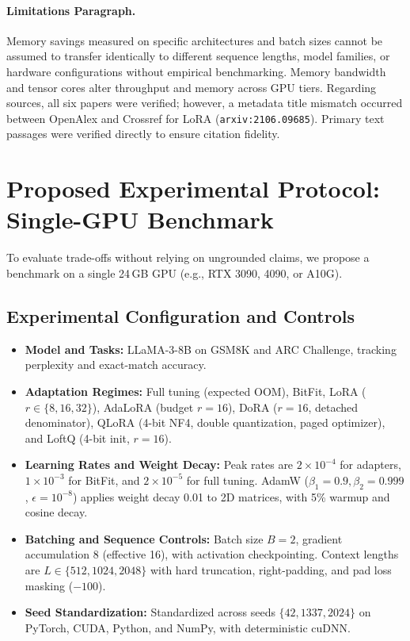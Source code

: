 \documentclass[11pt,a4paper]{article}
\begin{document}
\paragraph{Limitations Paragraph.}
Memory savings measured on specific architectures and batch sizes cannot be assumed to transfer identically to different sequence lengths, model families, or hardware configurations without empirical benchmarking. Memory bandwidth and tensor cores alter throughput and memory across GPU tiers. Regarding sources, all six papers were verified; however, a metadata title mismatch occurred between OpenAlex and Crossref for LoRA (\texttt{arxiv:2106.09685}). Primary text passages were verified directly to ensure citation fidelity.

\section{Proposed Experimental Protocol: Single-GPU Benchmark}

To evaluate trade-offs without relying on ungrounded claims, we propose a benchmark on a single 24\,GB GPU (e.g., RTX 3090, 4090, or A10G).

\subsection{Experimental Configuration and Controls}
\begin{itemize}
    \item \textbf{Model and Tasks:} LLaMA-3-8B on GSM8K and ARC Challenge, tracking perplexity and exact-match accuracy.
    \item \textbf{Adaptation Regimes:} Full tuning (expected OOM), BitFit, LoRA ($r \in \{8, 16, 32\}$), AdaLoRA (budget $r=16$), DoRA ($r=16$, detached denominator), QLoRA (4-bit NF4, double quantization, paged optimizer), and LoftQ (4-bit init, $r=16$).
    \item \textbf{Learning Rates and Weight Decay:} Peak rates are $2 \times 10^{-4}$ for adapters, $1 \times 10^{-3}$ for BitFit, and $2 \times 10^{-5}$ for full tuning. AdamW ($\beta_1=0.9, \beta_2=0.999$, $\epsilon=10^{-8}$) applies weight decay 0.01 to 2D matrices, with 5\% warmup and cosine decay.
    \item \textbf{Batching and Sequence Controls:} Batch size $B=2$, gradient accumulation 8 (effective 16), with activation checkpointing. Context lengths are $L \in \{512, 1024, 2048\}$ with hard truncation, right-padding, and pad loss masking ($-100$).
    \item \textbf{Seed Standardization:} Standardized across seeds $\{42, 1337, 2024\}$ on PyTorch, CUDA, Python, and NumPy, with deterministic cuDNN.
\end{itemize}
\end{document}
